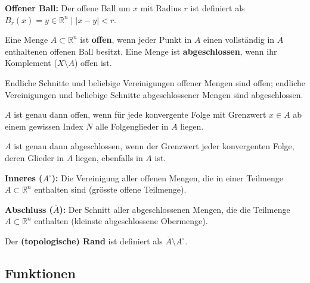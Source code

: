 \begin{definition}
    \textbf{Offener Ball:} Der offene Ball um $x$ mit Radius $r$ ist definiert als $B_r(x) = {y \in \mathbb{R}^n \mid |x-y| < r}$.
\end{definition}

\begin{definition}
    Eine Menge $A \subset \mathbb{R}^n$ ist \textbf{offen}, wenn jeder Punkt in $A$ einen vollständig in $A$ enthaltenen offenen Ball besitzt.
    Eine Menge ist \textbf{abgeschlossen}, wenn ihr Komplement ($X \setminus A$) offen ist.
\end{definition}

\begin{remark}
    Endliche Schnitte und beliebige Vereinigungen offener Mengen sind offen; endliche Vereinigungen und beliebige Schnitte abgeschlossener Mengen sind abgeschlossen.
\end{remark}

\begin{lemma}
    $A$ ist genau dann offen, wenn für jede konvergente Folge mit Grenzwert $x \in A$ ab einem gewissen Index $N$ alle Folgenglieder in $A$ liegen.
\end{lemma}

\begin{lemma}
    $A$ ist genau dann abgeschlossen, wenn der Grenzwert jeder konvergenten Folge, deren Glieder in $A$ liegen, ebenfalls in $A$ ist.
\end{lemma}

\begin{definition}
    \textbf{Inneres ($A^{\circ}$):} Die Vereinigung aller offenen Mengen, die in einer Teilmenge $A \subset \mathbb{R}^n$ enthalten sind (grösste offene Teilmenge).
\end{definition}

\begin{definition}
    \textbf{Abschluss ($\overline{A}$):} Der Schnitt aller abgeschlossenen Mengen, die die Teilmenge $A \subset \mathbb{R}^n$ enthalten (kleinste abgeschlossene Obermenge).
\end{definition}

\begin{definition}
    Der \textbf{(topologische) Rand} ist definiert als $\overline{A} \setminus A^\circ$.
\end{definition}

\subsection{Funktionen}

